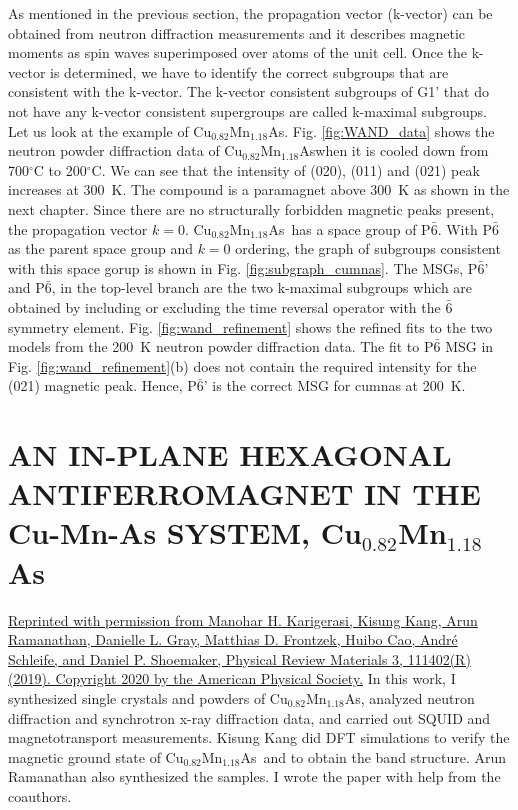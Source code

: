 \documentclass[letterpaper,10pt,doublespacing,edeposit]{uiucthesis2020}
\newcommand*{\cumnas}{Cu$_{0.82}$Mn$_{1.18}$As}
\begin{document}
\begin{mainmatter}
As mentioned in the previous section, the propagation vector (k-vector) can be obtained from neutron diffraction measurements and it describes magnetic moments as spin waves superimposed over atoms of the unit cell. Once the k-vector is determined, we have to identify the correct subgroups that are consistent with the k-vector. The k-vector consistent subgroups of G1' that do not have any k-vector consistent supergroups are called k-maximal subgroups. Let us look at the example of \cumnas. Fig. \ref{fig:WAND_data} shows the neutron powder diffraction data of \cumnas when it is cooled down from 700$^\circ$C to 200$^\circ$C. We can see that the intensity of (020), (011) and (021) peak increases at 300~K. The compound is a paramagnet above 300~K as shown in the next chapter. Since there are no structurally forbidden magnetic peaks present, the propagation vector $k = 0$. \cumnas\ has a space group of P$\bar{6}$. With P$\bar{6}$ as the parent space group and $k = 0$ ordering, the graph of subgroups consistent with this space gorup is shown in Fig. \ref{fig:subgraph_cumnas}. The MSGs, P$\bar{6}$' and P$\bar{6}$, in the top-level branch are the two k-maximal subgroups which are obtained by including or excluding the time reversal operator with the $\bar{6}$ symmetry element. Fig. \ref{fig:wand_refinement} shows the refined fits to the two models from the 200~K neutron powder diffraction data. The fit to P$\bar{6}$ MSG in Fig. \ref{fig:wand_refinement}(b) does not contain the required intensity for the (021) magnetic peak. Hence, P$\bar{6}$' is the correct MSG for cumnas at 200~K.



\chapter{AN IN-PLANE HEXAGONAL ANTIFERROMAGNET IN THE Cu-Mn-As SYSTEM, Cu$_{0.82}$Mn$_{1.18}$As}


\vspace{20mm}

\href{https://doi.org/10.1103/PhysRevMaterials.3.111402}{Reprinted with permission from Manohar H. Karigerasi, Kisung Kang, Arun Ramanathan, Danielle L. Gray, Matthias D. Frontzek, Huibo Cao, Andr\'e Schleife, and Daniel P. Shoemaker, Physical Review Materials 3, 111402(R) (2019). Copyright 2020 by the American Physical Society.} In this work, I synthesized single crystals and powders of \cumnas, analyzed neutron diffraction and synchrotron x-ray diffraction data, and carried out SQUID and magnetotransport measurements. Kisung Kang did DFT simulations to verify the magnetic ground state of \cumnas\ and to obtain the band structure. Arun Ramanathan also synthesized the samples. I wrote the paper with help from the coauthors.


\end{mainmatter}
\end{document}
